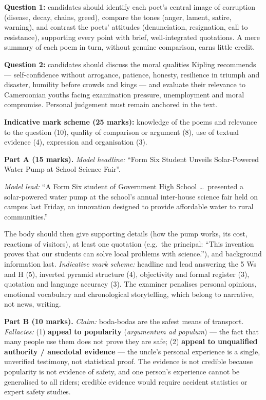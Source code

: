 \documentclass[11pt]{article}
\begin{document}
\begin{corrige}
\textbf{Question 1:} candidates should identify each poet's central image of corruption (disease, decay, chains, greed), compare the tones (anger, lament, satire, warning), and contrast the poets' attitudes (denunciation, resignation, call to resistance), supporting every point with brief, well-integrated quotations. A mere summary of each poem in turn, without genuine comparison, earns little credit.\par
\textbf{Question 2:} candidates should discuss the moral qualities Kipling recommends --- self-confidence without arrogance, patience, honesty, resilience in triumph and disaster, humility before crowds and kings --- and evaluate their relevance to Cameroonian youths facing examination pressure, unemployment and moral compromise. Personal judgement must remain anchored in the text.\par
\textbf{Indicative mark scheme (25 marks):} knowledge of the poems and relevance to the question (10), quality of comparison or argument (8), use of textual evidence (4), expression and organisation (3).
\end{corrige}

\begin{corrige}
\textbf{Part A (15 marks).} \emph{Model headline:} ``Form Six Student Unveils Solar-Powered Water Pump at School Science Fair''.\par
\emph{Model lead:} ``A Form Six student of Government High School \ldots\ presented a solar-powered water pump at the school's annual inter-house science fair held on campus last Friday, an innovation designed to provide affordable water to rural communities.''\par
The body should then give supporting details (how the pump works, its cost, reactions of visitors), at least one quotation (e.g.\ the principal: ``This invention proves that our students can solve local problems with science.''), and background information last. \emph{Indicative mark scheme:} headline and lead answering the 5 Ws and H (5), inverted pyramid structure (4), objectivity and formal register (3), quotation and language accuracy (3). The examiner penalises personal opinions, emotional vocabulary and chronological storytelling, which belong to narrative, not news, writing.\par
\textbf{Part B (10 marks).} \emph{Claim:} boda-bodas are the safest means of transport. \emph{Fallacies:} (1) \textbf{appeal to popularity} (\emph{argumentum ad populum}) --- the fact that many people use them does not prove they are safe; (2) \textbf{appeal to unqualified authority / anecdotal evidence} --- the uncle's personal experience is a single, unverified testimony, not statistical proof. The evidence is not credible because popularity is not evidence of safety, and one person's experience cannot be generalised to all riders; credible evidence would require accident statistics or expert safety studies.
\end{corrige}
\end{document}
